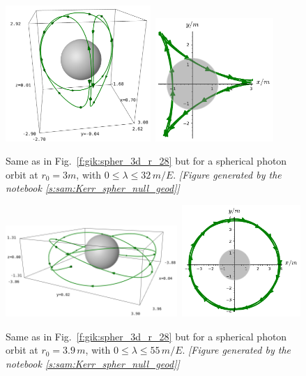 \begin{figure}
\centerline{\includegraphics[width=0.49\textwidth]{gik_spher_3d_r_30.png}\
\includegraphics[width=0.4\textwidth]{gik_spher_3d_r_30_xy.pdf}}
\caption[]{\label{f:gik:spher_3d_r_30} \footnotesize
Same as in Fig.~\ref{f:gik:spher_3d_r_28}  but for a
spherical photon orbit at $r_0=3 m$, with
$0 \leq \lambda \leq 32\, m/E$.
\textsl{[Figure generated by the notebook \ref{s:sam:Kerr_spher_null_geod}]}
}
\end{figure}

\begin{figure}
\centerline{\includegraphics[width=0.58\textwidth]{gik_spher_3d_r_39.png}\
\includegraphics[width=0.4\textwidth]{gik_spher_3d_r_39_xy.pdf}}
\caption[]{\label{f:gik:spher_3d_r_39} \footnotesize
Same as in Fig.~\ref{f:gik:spher_3d_r_28}  but for a
spherical photon orbit at $r_0=3.9\, m$, with
$0 \leq \lambda \leq 55\, m/E$.
\textsl{[Figure generated by the notebook \ref{s:sam:Kerr_spher_null_geod}]}
}
\end{figure}

